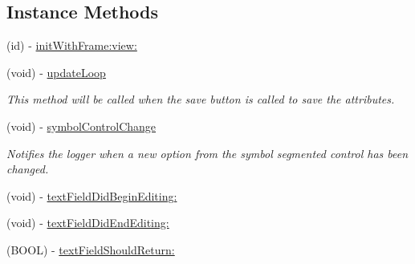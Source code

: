\subsection*{Instance Methods}
\begin{DoxyCompactItemize}
\item 
(id) -\/ \hyperlink{interface_loop_edit_menu_view_ad1475d40e606d4f009f89321944e3678}{init\-With\-Frame\-:view\-:}
\item 
\hypertarget{interface_loop_edit_menu_view_ae0f43dc61fe8f377acde5d5c252b6c0e}{(void) -\/ \hyperlink{interface_loop_edit_menu_view_ae0f43dc61fe8f377acde5d5c252b6c0e}{update\-Loop}}\label{interface_loop_edit_menu_view_ae0f43dc61fe8f377acde5d5c252b6c0e}

\begin{DoxyCompactList}\small\item\em This method will be called when the save button is called to save the attributes. \end{DoxyCompactList}\item 
\hypertarget{interface_loop_edit_menu_view_a8395f57f6403f4f8775c1062aca14bc6}{(void) -\/ \hyperlink{interface_loop_edit_menu_view_a8395f57f6403f4f8775c1062aca14bc6}{symbol\-Control\-Change}}\label{interface_loop_edit_menu_view_a8395f57f6403f4f8775c1062aca14bc6}

\begin{DoxyCompactList}\small\item\em Notifies the logger when a new option from the symbol segmented control has been changed. \end{DoxyCompactList}\item 
(void) -\/ \hyperlink{interface_loop_edit_menu_view_ac9394b979597f8df8e15f5abc1cc7a2e}{text\-Field\-Did\-Begin\-Editing\-:}
\item 
(void) -\/ \hyperlink{interface_loop_edit_menu_view_aa7337263d1e997c99cdc506fc61dcea3}{text\-Field\-Did\-End\-Editing\-:}
\item 
(B\-O\-O\-L) -\/ \hyperlink{interface_loop_edit_menu_view_a1a8ec9c257f3a894dc9b3389477f55e9}{text\-Field\-Should\-Return\-:}
\end{DoxyCompactItemize}
